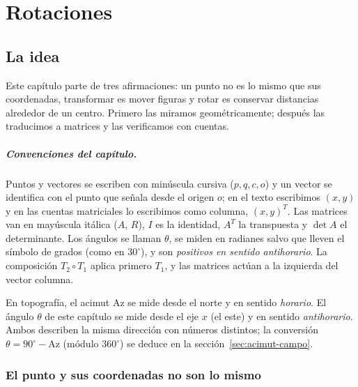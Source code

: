 \chapter{Rotaciones}\label{cap:04}

\section{La idea}

Este capítulo parte de tres afirmaciones: un punto no es lo mismo que sus coordenadas,
transformar es mover figuras y rotar es conservar distancias alrededor de un centro. Primero
las miramos geométricamente; después las traducimos a matrices y las verificamos con cuentas.

\paragraph{Convenciones del capítulo.}
Puntos y vectores se escriben con minúscula cursiva (\(p,q,c,o\)) y un vector se identifica
con el punto que señala desde el origen \(o\); en el texto escribimos \((x,y)\) y en las
cuentas matriciales lo escribimos como columna, \((x,y)^T\). Las matrices van en
mayúscula itálica (\(A\), \(R\)), \(I\) es la identidad, \(A^T\) la transpuesta y \(\det A\) el
determinante. Los ángulos se llaman \(\theta\), se miden en radianes salvo que lleven el
símbolo de grados (como en \(30^\circ\)), y son \emph{positivos en sentido antihorario}. La composición \(T_2\circ T_1\)
aplica primero \(T_1\), y las matrices actúan a la izquierda del vector columna.

\begin{atencion}
En topografía, el acimut \(\mathrm{Az}\) se mide desde el norte y en sentido \emph{horario}.
El ángulo \(\theta\) de este capítulo se mide desde el eje \(x\) (el este) y en sentido
\emph{antihorario}. Ambos describen la misma dirección con números distintos; la conversión
\(\theta=90^\circ-\mathrm{Az}\) (módulo \(360^\circ\)) se deduce en la
sección~\ref{sec:acimut-campo}.
\end{atencion}

\subsection{El punto y sus coordenadas no son lo mismo}\label{sec:punto-coordenadas}

{\small\vspace{1mm}\par}



